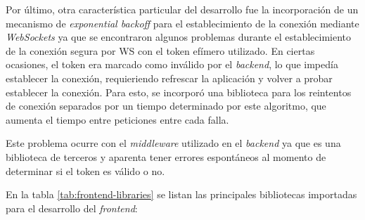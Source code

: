 Por último, otra característica particular del desarrollo fue la incorporación de un mecanismo de \textit{exponential backoff} para el establecimiento de la conexión mediante \textit{WebSockets} ya que se encontraron algunos problemas durante el establecimiento de la conexión segura por WS con el token efímero utilizado. En ciertas ocasiones, el token era marcado como inválido por el \textit{backend}, lo que impedía establecer la conexión, requieriendo refrescar la aplicación y volver a probar establecer la conexión. Para esto, se incorporó una biblioteca para los reintentos de conexión separados por un tiempo determinado por este algoritmo, que aumenta el tiempo entre peticiones entre cada falla\citep{BACKOFF:1}.

Este problema ocurre con el \textit{middleware} utilizado en el \textit{backend} ya que es una biblioteca de terceros y aparenta tener errores espontáneos al momento de determinar si el token es válido o no.


En la tabla \ref{tab:frontend-libraries} se listan las principales bibliotecas importadas para el desarrollo del \textit{frontend}: 

